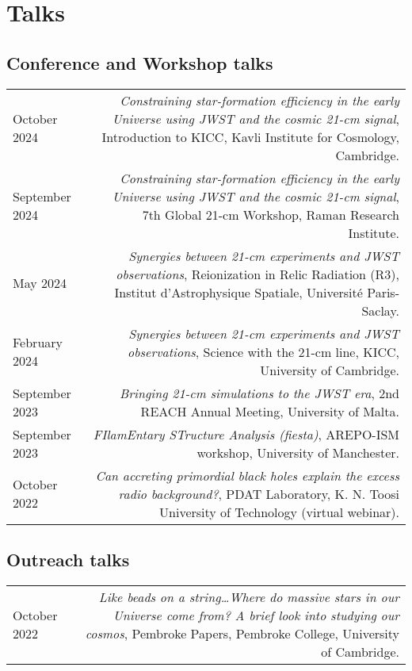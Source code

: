 \documentclass{article}
\begin{document}
\section*{Talks}
\subsection*{Conference and Workshop talks}
\begin{tabular}{L!{\vrule}R}

    October 2024 & \textit{Constraining star-formation efficiency in the early Universe using JWST and the cosmic 21-cm signal}, Introduction to KICC, Kavli Institute for Cosmology, Cambridge. \\

    September 2024 & \textit{Constraining star-formation efficiency in the early Universe using JWST and the cosmic 21-cm signal}, 7th Global 21-cm Workshop, Raman Research Institute. \\

    May 2024 & \textit{Synergies between 21-cm experiments and JWST observations}, Reionization in Relic Radiation (R3), Institut d'Astrophysique Spatiale, Université Paris-Saclay. \\

    February 2024 & \textit{Synergies between 21-cm experiments and JWST observations}, Science with the 21-cm line, KICC, University of Cambridge. \\

    September 2023 & \textit{Bringing 21-cm simulations to the JWST era}, 2nd REACH Annual Meeting, University of Malta. \\

    September 2023 & \textit{FIlamEntary STructure Analysis (fiesta)}, AREPO-ISM workshop, University of Manchester. \\

    October 2022 & \textit{Can accreting primordial black holes explain the excess radio background?}, PDAT Laboratory, K. N. Toosi University of Technology (virtual webinar). \\

\end{tabular}

\subsection*{Outreach talks}
\begin{tabular}{L!{\vrule}R}

  October 2022 & \textit{Like beads on a string\ldots Where do massive stars in our Universe come from? A brief look into studying our cosmos}, Pembroke Papers, Pembroke College, University of Cambridge. \\

\end{tabular}
\end{document}
